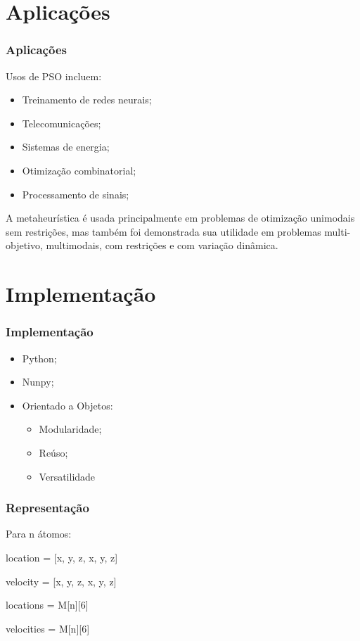 \documentclass{beamer}
\begin{document}
\section{Aplicações}

\begin{frame}
\frametitle{Aplicações}
Usos de PSO incluem:
\begin{itemize}
\item Treinamento de redes neurais;
\item Telecomunicações;
\item Sistemas de energia;
\item Otimização combinatorial;
\item Processamento de sinais;
\end{itemize}
A metaheurística é usada principalmente em problemas de otimização unimodais sem restrições, mas também foi demonstrada sua utilidade em problemas multi-objetivo, multimodais, com restrições e com variação dinâmica. 
\end{frame}

\section{Implementação}

\begin{frame}
\frametitle{Implementação}
\begin{itemize}
\item Python;
\item Nunpy;
\item Orientado a Objetos:
\begin{itemize}
\item Modularidade;
\item Reúso;
\item Versatilidade
\end{itemize}
\end{itemize}
\end{frame}

\begin{frame}
\frametitle{Representação}
Para n átomos:

location = [x, y, z, x, y, z]

velocity = [x, y, z, x, y, z]

locations = M[n][6]

velocities = M[n][6]
\end{frame}
\end{document}

